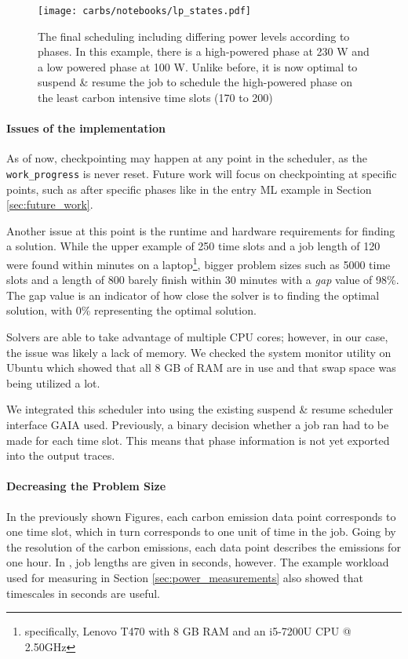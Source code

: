 \begin{figure}
    \texttt{[image: carbs/notebooks/lp\_states.pdf]}
    \caption{The final scheduling including differing power levels according to phases. In this example, there is a high-powered phase at 230 W and a low powered phase at 100 W. Unlike before, it is now optimal to suspend \& resume the job to schedule the high-powered phase on the least carbon intensive time slots (170 to 200)}
    \label{fig:lp_states}
\end{figure}

\paragraph{Issues of the implementation}

As of now, checkpointing may happen at any point in the scheduler, as the \verb|work_progress| is never reset. 
Future work will focus on checkpointing at specific points, such as after specific phases like in the entry ML example in Section \ref{sec:future_work}.

Another issue at this point is the runtime and hardware requirements for finding a solution.
While the upper example of 250 time slots and a job length of 120 were found within minutes on a laptop\footnote{specifically, Lenovo T470 with 8 GB RAM and an i5-7200U CPU @ 2.50GHz}, bigger problem sizes such as 5000 time slots and a length of 800 barely finish within 30 minutes with a \emph{gap} value of 98\%.
The gap value is an indicator of how close the solver is to finding the optimal solution, with 0\% representing the optimal solution.

Solvers are able to take advantage of multiple CPU cores; however, in our case, the issue was likely a lack of memory. 
We checked the system monitor utility on Ubuntu which showed that all 8 GB of RAM are in use and that swap space was being utilized a lot.

We integrated this scheduler into \programname{} using the existing suspend \& resume scheduler interface GAIA used.
Previously, a binary decision whether a job ran had to be made for each time slot.
This means that phase information is not yet exported into the output traces.

\paragraph{Decreasing the Problem Size}

In the previously shown Figures, each carbon emission data point corresponds to one time slot, which in turn corresponds to one unit of time in the job. 
Going by the resolution of the carbon emissions, each data point describes the emissions for one hour. 
In \programname{}, job lengths are given in seconds, however. 
The example workload used for measuring in Section \ref{sec:power_measurements} also showed that timescales in seconds are useful. 

